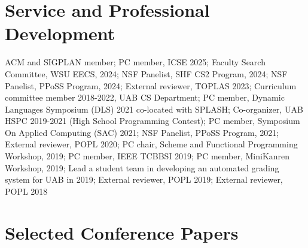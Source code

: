 \documentclass[line]{res}
\begin{document}
\begin{resume}
\section{\large Service and Professional Development} \vspace{0.15in}
      ACM and SIGPLAN member;
      PC member, ICSE 2025;
      Faculty Search Committee, WSU EECS, 2024;
      NSF Panelist, SHF CS2 Program, 2024;
      NSF Panelist, PPoSS Program, 2024;
      External reviewer, TOPLAS 2023;
      Curriculum committee member 2018-2022, UAB CS Department;
      PC member, Dynamic Languages Symposium (DLS) 2021 co-located with SPLASH;
      Co-organizer, UAB HSPC 2019-2021 (High School Programming Contest);
      PC member, Symposium On Applied Computing (SAC) 2021;
      NSF Panelist, PPoSS Program, 2021;
      External reviewer, POPL 2020;
      PC chair, Scheme and Functional Programming Workshop, 2019;
      PC member, IEEE TCBBSI 2019;
      PC member, MiniKanren Workshop, 2019;
      Lead a student team in developing an automated grading system for UAB in 2019;
      External reviewer, POPL 2019;
      External reviewer, POPL 2018 

%


%



\section{\large Selected Conference Papers} 
\vspace{0.1cm}

\vspace{-0.4cm}


\end{resume}
\end{document}

